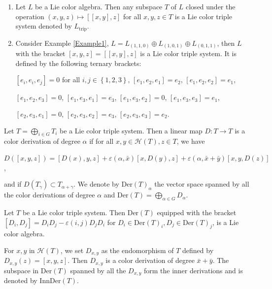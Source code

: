 \documentclass[11pt, twoside]{article}
\begin{document}
\begin{ex}
\begin{enumerate}
    \item Let $L$ be a Lie color algebra. Then any subspace $T$ of $L$ closed under the operation $(x,y,z) \mapsto[[x,y],z] $ for all $x,y,z \in T $ is a Lie color triple system denoted by $L_{\mathrm{trip}} $.
    \item Consider Example \ref{Example1}, $L=L_{(1,1,0)}\oplus L_{(1,0,1)} \oplus L_{(0,1,1)} $, then $L $ with the bracket $[x,y,z]=[[x,y],z] $ is a Lie color triple system. It is defined by the following ternary brackets:\begin{center}
        $[e_i,e_i,e_j]=0 $ for all $i,j\in \left\{1,2,3 \right\}$, $[e_1,e_2,e_1]=e_2 $, $[e_1,e_2,e_2]=e_1 $,

        $[e_1,e_2,e_3]=0 $, $[e_1,e_3,e_1]=e_3 $, $[e_1,e_3,e_2]=0 $, $[e_1,e_3,e_3]= e_1 $,

        $[e_2,e_3,e_1]=0 $, $[e_2,e_3,e_2]=e_3 $, $[e_2,e_3,e_3]=e_2 $.
    \end{center}
    \end{enumerate}
\end{ex}



\begin{defi}[\cite{KZ23}]
    Let $T= \bigoplus\limits_{i\in G}T_i $ be a Lie color triple system. Then a linear map $D:T\to T$ is a color derivation of degree $\alpha$ if for all $x,y \in \mathcal{H}(T), z\in T$, we have \begin{center}
        $D([x,y,z])= [D(x),y,z]+ \varepsilon(\alpha,\bar{x})[x,D(y),z]+ \varepsilon(\alpha,\bar{x}+\bar{y})[x,y,D(z)] $,
    \end{center} and if $D(T_\gamma)\subset T_{\alpha+\gamma}$. We denote by $\mathrm{Der}(T)_{\alpha} $ the vector space spanned by all the color derivations of degree $\alpha $ and $\mathrm{Der}(T)= \bigoplus\limits_{\alpha\in G}D_\alpha $.
\end{defi}

\begin{thm}[\cite{KZ23}]
    Let $T$ be a Lie color triple system. Then $\mathrm{Der}(T)$ equipped with the bracket $[D_i,D_j]= D_iD_j - \varepsilon(i,j)D_jD_i $ for $D_i\in \mathrm{Der}(T)_i,D_j\in \mathrm{Der}(T)_j $, is a Lie color algebra.
\end{thm}

For $x,y$ in $\mathcal{H}(T) $, we set $D_{x,y} $ as the endomorphism of $T $ defined by %
    $D_{x,y}(z)=[x,y,z] $.
Then $D_{x,y} $ is a color derivation of degree $\bar{x}+\bar{y} $.  The subspace in $\mathrm{Der}(T)$ spanned by all the $D_{x,y} $ form the inner derivations and is denoted by $\mathrm{InnDer}(T)$.
\end{document}
